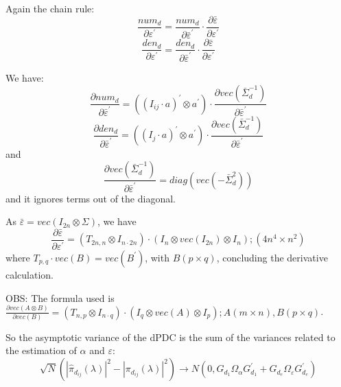 \documentclass[a4paper,10pt]{article}
\begin{document}
Again the chain rule:
\begin{equation}
\frac{num_{d}}{\partial \varepsilon^{'}} = \frac{num_{d}}{\partial \bar{\varepsilon}^{'}} \cdot \frac{\partial \bar{\varepsilon}}{\partial \varepsilon^{'}}
\end{equation}
\begin{equation}
\frac{den_{d}}{\partial \varepsilon^{'}} = \frac{den_{d}}{\partial \bar{\varepsilon}^{'}} \cdot \frac{\partial \bar{\varepsilon}}{\partial \varepsilon^{'}}
\end{equation}

We have:
\begin{equation}
\frac{\partial num_{d}}{\partial \bar{\varepsilon}^{'}} = ((I_{ij} \cdot a)^{'} \otimes a^{'}) \cdot \frac{\partial vec(\bar{\Sigma}_{d}^{-1})}{\partial \bar{\varepsilon}^{'}}
\end{equation}
\begin{equation}
\frac{\partial den_{d}}{\partial \bar{\varepsilon}^{'}} = ((I_{j} \cdot a)^{'} \otimes a^{'}) \cdot \frac{\partial vec(\bar{\Sigma}_{d}^{-1})}{\partial \bar{\varepsilon}^{'}}
\end{equation}
and
\begin{equation}
\frac{\partial vec(\bar{\Sigma}_{d}^{-1})}{\partial \bar{\varepsilon}^{'}} = diag(vec(-\bar{\Sigma}_{d}^{2}))
\end{equation}
and it ignores terms out of the diagonal.

As $\bar{\varepsilon} = vec(I_{2n} \otimes \Sigma)$, we have
\begin{equation}
\frac{\partial \bar{\varepsilon}}{\partial \varepsilon^{'}} = (T_{2n,n} \otimes I_{n \cdot 2n}) \cdot (I_{n} \otimes vec(I_{2n}) \otimes I_{n}); (4n^{4} \times n^{2})
\end{equation}
where $T_{p,q} \cdot vec(B) = vec(B^{'})$, with $B (p \times q)$, concluding the derivative calculation.

OBS: The formula used is $\frac{\partial vec(A \otimes B)}{\partial vec(B)} = (T_{n,p} \otimes I_{n \cdot q}) \cdot (I_{q} \otimes vec(A) \otimes I_{p}); A (m \times n), B (p \times q)$.

So the asymptotic variance of the dPDC is the sum of the variances related to the estimation of $\alpha$ and $\varepsilon$:
\begin{equation}
\sqrt{N} (|\hat{\pi}_{d_{ij}}(\lambda)|^{2} - |\pi_{d_{ij}}(\lambda)|^{2}) \to N(0, G_{d_1} \Omega_{\alpha} G_{d_1}^{'} + G_{d_e} \Omega_{\varepsilon} G_{d_e}^{'}) 
\end{equation}
\end{document}
